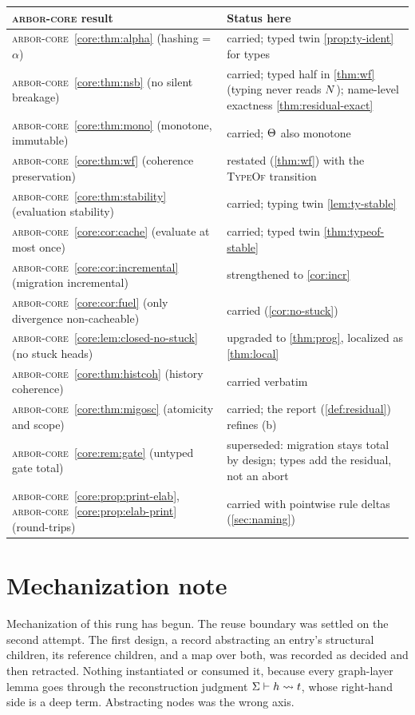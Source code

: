 \documentclass[11pt]{article}
\theoremstyle{definition}
\theoremstyle{plain}
\theoremstyle{remark}
\newcommand{\arborcore}{\textsc{arbor-core}}
\newcommand{\coreref}[1]{\arborcore~\cref{core:#1}}
\begin{document}
\begin{center}
\small
\begin{tabular}{>{\raggedright\arraybackslash}p{} >{\raggedright\arraybackslash}p{}}
\textbf{\arborcore{} result} & \textbf{Status here} \\
\hline
\coreref{thm:alpha} (hashing = $\alpha$) & carried; typed twin \cref{prop:ty-ident} for types \\
\coreref{thm:nsb} (no silent breakage) & carried; typed half in \cref{thm:wf} (typing never reads $N$); name-level exactness \cref{thm:residual-exact} \\
\coreref{thm:mono} (monotone, immutable) & carried; $\Theta$ also monotone \\
\coreref{thm:wf} (coherence preservation) & restated (\cref{thm:wf}) with the \textsc{TypeOf} transition \\
\coreref{thm:stability} (evaluation stability) & carried; typing twin \cref{lem:ty-stable} \\
\coreref{cor:cache} (evaluate at most once) & carried; typed twin \cref{thm:typeof-stable} \\
\coreref{cor:incremental} (migration incremental) & strengthened to \cref{cor:incr} \\
\coreref{cor:fuel} (only divergence non-cacheable) & carried (\cref{cor:no-stuck}) \\
\coreref{lem:closed-no-stuck} (no stuck heads) & upgraded to \cref{thm:prog}, localized as \cref{thm:local} \\
\coreref{thm:histcoh} (history coherence) & carried verbatim \\
\coreref{thm:migosc} (atomicity and scope) & carried; the report (\cref{def:residual}) refines (b) \\
\coreref{rem:gate} (untyped gate total) & superseded: migration stays total by design; types add the residual, not an abort \\
\coreref{prop:print-elab}, \coreref{prop:elab-print} (round-trips) & carried with pointwise rule deltas (\cref{sec:naming}) \\
\end{tabular}
\end{center}

\section{Mechanization note}\label{sec:mech}
Mechanization of this rung has begun. The reuse boundary was settled on the second attempt.
The first design, a record abstracting an entry's structural children, its reference children,
and a map over both, was recorded as decided and then retracted. Nothing instantiated or
consumed it, because every graph-layer lemma goes through the reconstruction judgment
$\Sigma \vdash h \rightsquigarrow t$, whose right-hand side is a deep term. Abstracting nodes
was the wrong axis.
\end{document}
